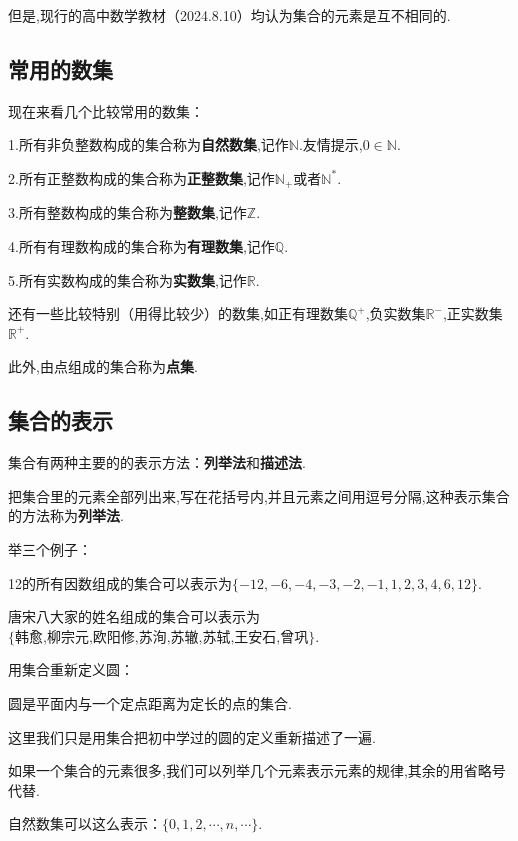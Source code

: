 \documentclass[lang=cn,math=cm,chinesefont=nofont,11pt,scheme=chinese,twocol]{elegantbook}
\begin{document}
但是,现行的高中数学教材（2024.8.10）均认为集合的元素是互不相同的.

\subsection{常用的数集}
现在来看几个比较常用的数集：

1.所有非负整数构成的集合称为\textbf{自然数集},记作$\mathbb{N}$.友情提示,$0\in \mathbb{N}$.

2.所有正整数构成的集合称为\textbf{正整数集},记作$\mathbb{N}_+$或者$\mathbb{N}^*$.

3.所有整数构成的集合称为\textbf{整数集},记作$\mathbb{Z}$.

4.所有有理数构成的集合称为\textbf{有理数集},记作$\mathbb{Q}$.

5.所有实数构成的集合称为\textbf{实数集},记作$\mathbb{R}$.

还有一些比较特别（用得比较少）的数集,如正有理数集$\mathbb{Q}^+$,负实数集$\mathbb{R}^-$,正实数集$\mathbb{R}^+$.

此外,由点组成的集合称为\textbf{点集}.

\subsection{集合的表示}
集合有两种主要的的表示方法：\textbf{列举法}和\textbf{描述法}.

把集合里的元素全部列出来,写在花括号内,并且元素之间用逗号分隔,这种表示集合的方法称为\textbf{列举法}.

举三个例子：

\begin{example}
  12的所有因数组成的集合可以表示为$\{-12,-6,-4,-3,-2,-1,1,2,3,4,6,12\}$.
\end{example}
\begin{example}
  唐宋八大家的姓名组成的集合可以表示为$\{\text{韩愈,柳宗元,欧阳修,苏洵,苏辙,苏轼,王安石,曾巩}\}$.
\end{example}
\begin{example}
  用集合重新定义圆：
\end{example}
\begin{definition}[圆]
  圆是平面内与一个定点距离为定长的点的集合.
\end{definition}
这里我们只是用集合把初中学过的圆的定义重新描述了一遍.

如果一个集合的元素很多,我们可以列举几个元素表示元素的规律,其余的用省略号代替.

\begin{example}
  自然数集可以这么表示：$\{0,1,2,\cdots,n,\cdots\}$.
\end{example}
\end{document}
